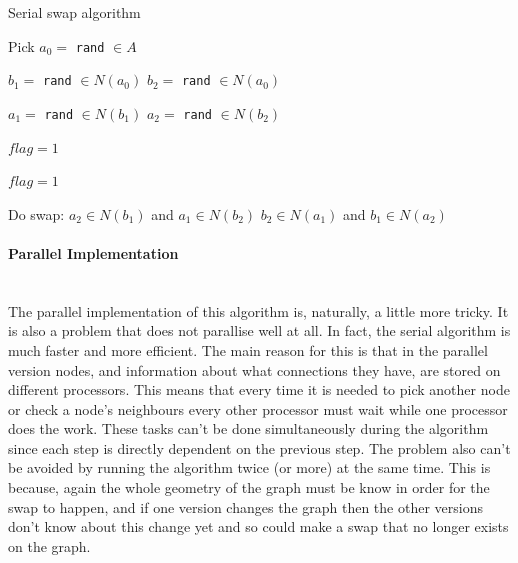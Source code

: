 \documentclass[pdftex,12pt,a4paper]{article}
\begin{document}
\begin{algorithm}
\caption{Serial swap algorithm}
\begin{algorithmic}

\State Pick $a_0 =$ \verb|rand| $\in A$

\State $b_1 =$ \verb|rand| $\in N(a_0)$
\State $b_2 =$ \verb|rand| $\in N(a_0)$
\EndWhile


\State $a_1 =$ \verb|rand| $\in N(b_1)$
\State $a_2 =$ \verb|rand| $\in N(b_2)$
\EndWhile

\State $flag =1$
\EndIf

\State $flag =1$
\EndIf

\State Do swap:
\State $a_2 \in N(b_1)$ and $a_1 \in N(b_2)$
\State $b_2 \in N(a_1)$ and $b_1 \in N(a_2)$

\EndWhile

\end{algorithmic}
\end{algorithm}

\paragraph{Parallel Implementation} ~\\

The parallel implementation of this algorithm is, naturally, a little more tricky. It is also a problem that does not parallise well at all. In fact, the serial algorithm is much faster and more efficient. The main reason for this is that in the parallel version nodes, and information about what connections they have, are stored on different processors. This means that every time it is needed to pick another node or check a node's neighbours every other processor must wait while one processor does the work. These tasks can't be done simultaneously during the algorithm since each step is directly dependent on the previous step. The problem also can't be avoided by running the algorithm twice (or more) at the same time. This is because, again the whole geometry of the graph must be know in order for the swap to happen, and if one version changes the graph then the other versions don't know about this change yet and so could make a swap that no longer exists on the graph.

\end{document}

